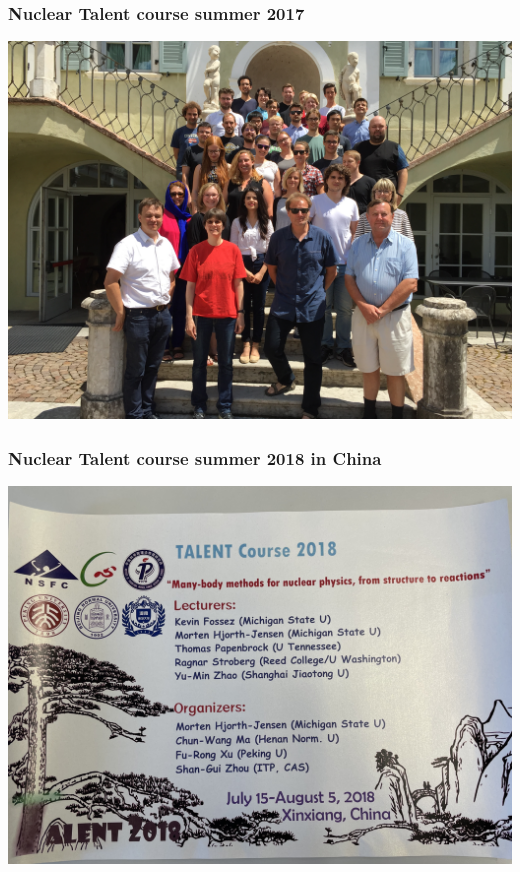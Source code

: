 \documentclass{beamer}
\begin{document}
\begin{frame}
\frametitle{Nuclear Talent course summer 2017}

\vspace{6mm}

\centerline{\includegraphics[width=1.0\linewidth]{Photos/talent2017.jpg}}

\vspace{6mm}
\end{frame}

\begin{frame}
\frametitle{Nuclear Talent course summer 2018 in China}

\vspace{6mm}

\centerline{\includegraphics[width=1.0\linewidth]{Photos/talent2018.jpeg}}

\vspace{6mm}
\end{frame}
\end{document}
